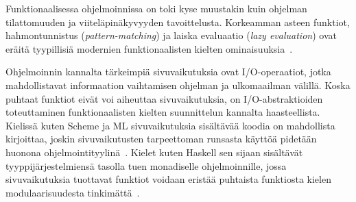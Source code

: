 \par
Funktionaalisessa ohjelmoinnissa on toki kyse muustakin kuin ohjelman tilattomuuden ja viiteläpinäkyvyyden tavoittelusta. Korkeamman asteen funktiot, hahmontunnistus (\textit{pattern-matching}) ja laiska evaluaatio (\textit{lazy evaluation}) ovat eräitä tyypillisiä modernien funktionaalisten kielten ominaisuuksia~\cite{Hudak89}.  
\par
Ohjelmoinnin kannalta tärkeimpiä sivuvaikutuksia ovat I/O-operaatiot, jotka mahdollistavat informaation vaihtamisen ohjelman ja ulkomaailman välillä.
Koska puhtaat funktiot eivät voi aiheuttaa sivuvaikutuksia, on I/O-abstraktioiden toteuttaminen funktionaalisten kielten suunnittelun kannalta haasteellista. Kielissä kuten Scheme ja ML sivuvaikutuksia sisältävää koodia on mahdollista kirjoittaa, joskin sivuvaikutusten tarpeettoman runsasta käyttöä pidetään huonona ohjelmointityylinä~\cite[p.~23]{Hudak89}. Kielet kuten Haskell sen sijaan sisältävät tyyppijärjestelmiensä tasolla tuen monadiselle ohjelmoinnille, jossa sivuvaikutuksia tuottavat funktiot voidaan eristää puhtaista funktiosta kielen modulaarisuudesta tinkimättä~\cite[p.~4--16]{PJ2000}.       